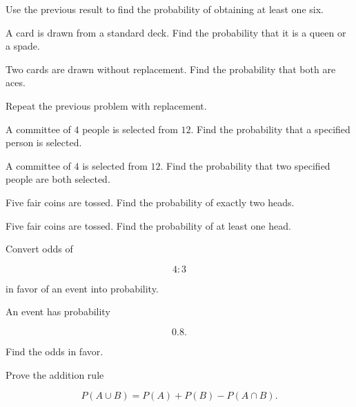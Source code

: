 \begin{exercise}[2]
Use the previous result to find the probability of obtaining at least
one six.
\end{exercise}

\begin{exercise}[2]
A card is drawn from a standard deck. Find the probability that it is a
queen or a spade.
\end{exercise}

\begin{exercise}[2]
Two cards are drawn without replacement. Find the probability that both
are aces.
\end{exercise}

\begin{exercise}[2]
Repeat the previous problem with replacement.
\end{exercise}

\begin{exercise}[2]
A committee of \(4\) people is selected from \(12\). Find the probability
that a specified person is selected.
\end{exercise}

\begin{exercise}[2]
A committee of \(4\) is selected from \(12\). Find the probability that
two specified people are both selected.
\end{exercise}

\begin{exercise}[2]
Five fair coins are tossed. Find the probability of exactly two heads.
\end{exercise}

\begin{exercise}[2]
Five fair coins are tossed. Find the probability of at least one head.
\end{exercise}

\begin{exercise}[2]
Convert odds of

\[
4:3
\]

in favor of an event into probability.
\end{exercise}

\begin{exercise}[2]
An event has probability

\[
0.8.
\]

Find the odds in favor.
\end{exercise}

\begin{exercise}[3]
Prove the addition rule

\[
P(A\cup B)
=
P(A)+P(B)-P(A\cap B).
\]
\end{exercise}

